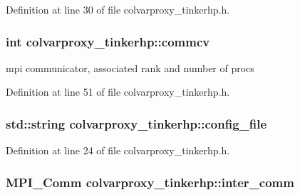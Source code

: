 Definition at line 30 of file colvarproxy\-\_\-tinkerhp.\-h.

\hypertarget{classcolvarproxy__tinkerhp_ac0ce2e771bc43eacc450f68d07c6a6b2}{
\subsubsection[{commcv}]{\setlength{\rightskip}{0pt plus 5cm}int colvarproxy\-\_\-tinkerhp\-::commcv\hspace{0.3cm}{\ttfamily [private]}}}\label{classcolvarproxy__tinkerhp_ac0ce2e771bc43eacc450f68d07c6a6b2}


mpi communicator, associated rank and number of procs 



Definition at line 51 of file colvarproxy\-\_\-tinkerhp.\-h.

\hypertarget{classcolvarproxy__tinkerhp_a34ebcc6f4b694166fe32fb0ea331ba78}{
\subsubsection[{config\-\_\-file}]{\setlength{\rightskip}{0pt plus 5cm}std\-::string colvarproxy\-\_\-tinkerhp\-::config\-\_\-file\hspace{0.3cm}{\ttfamily [private]}}}\label{classcolvarproxy__tinkerhp_a34ebcc6f4b694166fe32fb0ea331ba78}


Definition at line 24 of file colvarproxy\-\_\-tinkerhp.\-h.

\hypertarget{classcolvarproxy__tinkerhp_af95a5d16bb33e00c0b5c55fb470af8df}{
\subsubsection[{inter\-\_\-comm}]{\setlength{\rightskip}{0pt plus 5cm}M\-P\-I\-\_\-\-Comm colvarproxy\-\_\-tinkerhp\-::inter\-\_\-comm\hspace{0.3cm}{\ttfamily [private]}}}\label{classcolvarproxy__tinkerhp_af95a5d16bb33e00c0b5c55fb470af8df}


